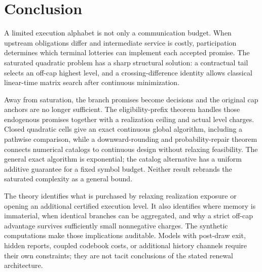\section{Conclusion}
A limited execution alphabet is not only a communication budget. When upstream obligations differ and intermediate service is costly, participation determines which terminal lotteries can implement each accepted promise. The saturated quadratic problem has a sharp structural solution: a contractual tail selects an off-cap highest level, and a crossing-difference identity allows classical linear-time matrix search after continuous minimization.

Away from saturation, the branch promises become decisions and the original cap anchors are no longer sufficient. The eligibility-prefix theorem handles those endogenous promises together with a realization ceiling and actual level charges. Closed quadratic cells give an exact continuous global algorithm, including a pathwise comparison, while a downward-rounding and probability-repair theorem connects numerical catalogs to continuous design without relaxing feasibility. The general exact algorithm is exponential; the catalog alternative has a uniform additive guarantee for a fixed symbol budget. Neither result rebrands the saturated complexity as a general bound.

The theory identifies what is purchased by relaxing realization exposure or opening an additional certified execution level. It also identifies where memory is immaterial, when identical branches can be aggregated, and why a strict off-cap advantage survives sufficiently small nonnegative charges. The synthetic computations make those implications auditable. Models with post-draw exit, hidden reports, coupled codebook costs, or additional history channels require their own constraints; they are not tacit conclusions of the stated renewal architecture.
